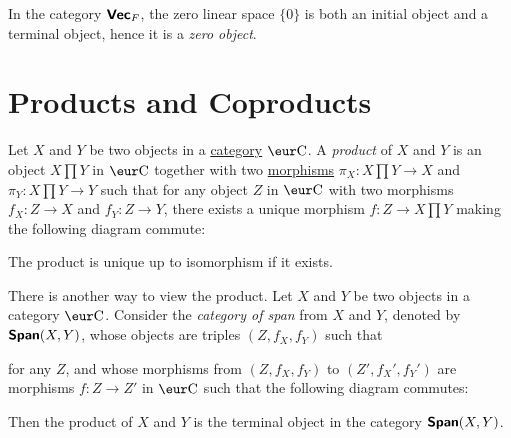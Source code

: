 \begin{example}
  In the category $\operatorname{\text{\normalfont\bf\sffamily Vec}}_F$, the zero linear space $\{0\}$ is both an initial object and a terminal object, hence it is a \emph{zero object}.
\end{example}

\section{Products and Coproducts}

\begin{definition}[Product]\label{def:product}
  Let $X$ and $Y$ be two objects in a \hyperref[def:category]{category} $\Ca$. A \emph{product} of $X$ and $Y$ is an object $X \prod Y$ in $\Ca$ together with two \hyperref[def:morphism]{morphisms} $\pi_X \colon X \prod Y \to X$ and $\pi_Y \colon X \prod Y \to Y$ such that for any object $Z$ in $\Ca$ with two morphisms $f_X \colon Z \to X$ and $f_Y \colon Z \to Y$, there exists a unique morphism $f \colon Z \to X \prod Y$ making the following diagram commute:
  \begin{center}
  \end{center}
\end{definition}

\begin{remark}
  The product is unique up to isomorphism if it exists.
\end{remark}

There is another way to view the product. Let $X$ and $Y$ be two objects in a category $\Ca$. Consider the \emph{category of span} from $X$ and $Y$, denoted by $\text{\normalfont\bf\sffamily Span}(X, Y)$, whose objects are triples $(Z, f_X, f_Y)$ such that  for any $Z$, and whose morphisms from $(Z, f_X, f_Y)$ to $(Z', f_X', f_Y')$ are morphisms $f \colon Z \to Z'$ in $\Ca$ such that the following diagram commutes:
\begin{center}
\end{center}
Then the product of $X$ and $Y$ is the terminal object in the category $\text{\normalfont\bf\sffamily Span}(X, Y)$.

